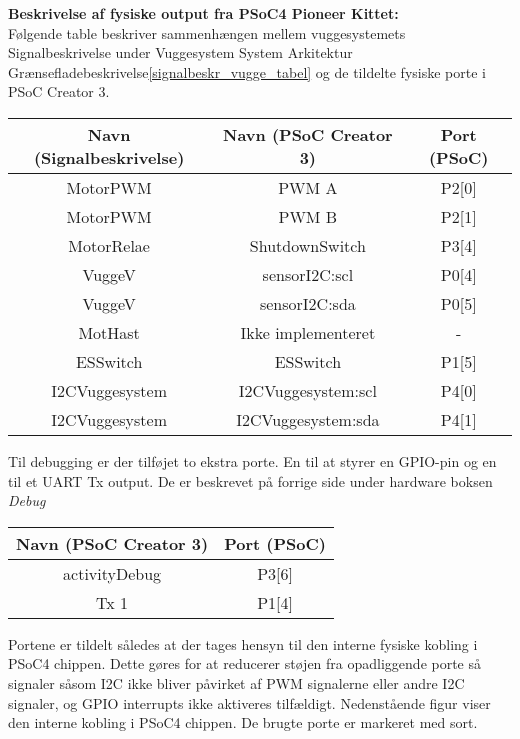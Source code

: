 \textbf{Beskrivelse af fysiske output fra PSoC4 Pioneer Kittet:} \\
Følgende table beskriver sammenhængen mellem vuggesystemets Signalbeskrivelse under Vuggesystem System Arkitektur Grænsefladebeskrivelse\vref{signalbeskr_vugge_tabel} og de tildelte fysiske porte i PSoC Creator 3.
\begin{center}
    \begin{tabular}{| c | c | c |}
    \hline
    \textbf{Navn (Signalbeskrivelse)}	& \textbf{Navn (PSoC Creator 3)} & \textbf{Port (PSoC)} \\ \hline
    MotorPWM & PWM A & P2[0] \\ \hline
    MotorPWM & PWM B & P2[1] \\ \hline
    MotorRelae & ShutdownSwitch & P3[4] \\ \hline
    VuggeV & sensorI2C:scl & P0[4] \\ \hline
    VuggeV & sensorI2C:sda & P0[5] \\ \hline
    MotHast & Ikke implementeret & - \\ \hline
    ESSwitch & ESSwitch & P1[5] \\ \hline
    I2CVuggesystem & I2CVuggesystem:scl & P4[0] \\ \hline
    I2CVuggesystem & I2CVuggesystem:sda & P4[1] \\
  	\hline
    \end{tabular}
\end{center}
Til debugging er der tilføjet to ekstra porte. En til at styrer en GPIO-pin og en til et UART Tx output. De er beskrevet på forrige side under hardware boksen \textit{Debug}
\begin{center}
    \begin{tabular}{| c | c |}
    \hline
    \textbf{Navn (PSoC Creator 3)} & \textbf{Port (PSoC)} \\ \hline
    activityDebug & P3[6] \\ \hline
    Tx 1 & P1[4] \\
  	\hline
    \end{tabular}
\end{center}
Portene er tildelt således at der tages hensyn til den interne fysiske kobling i PSoC4 chippen. Dette gøres for at reducerer støjen fra opadliggende porte så signaler såsom I2C ikke bliver påvirket af PWM signalerne eller andre I2C signaler, og GPIO interrupts ikke aktiveres tilfældigt. Nedenstående figur viser den interne kobling i PSoC4 chippen. De brugte porte er markeret med sort.

